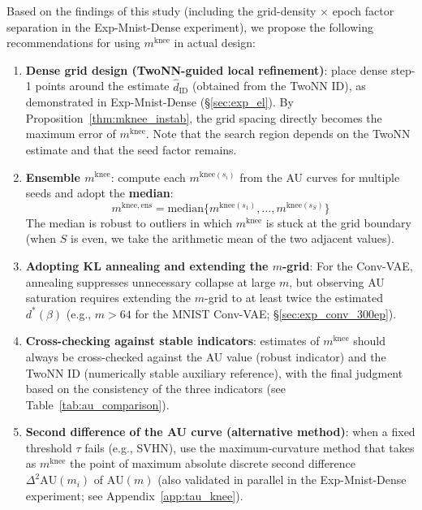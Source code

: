 \documentclass[make,article,submit,pdftex,moreauthors]{Definitions/mdpi}
\newcommand{\mknee}{m^{\mathrm{knee}}}
\begin{document}
Based on the findings of this study (including the grid-density $\times$ epoch factor
separation in the Exp-Mnist-Dense experiment), we propose the following recommendations
for using $\mknee$ in actual design:
\begin{enumerate}
  \item \textbf{Dense grid design (TwoNN-guided local refinement)}: place dense
        step-1 points around the estimate $\hat{d}_\mathrm{ID}$ (obtained from the TwoNN
        ID), as demonstrated in Exp-Mnist-Dense (\S\ref{sec:exp_el}).
        By Proposition~\ref{thm:mknee_instab}, the grid spacing directly becomes the
        maximum error of $\mknee$.
        Note that the search region depends on the TwoNN estimate and that the seed
        factor remains.
  \item \textbf{Ensemble $\mknee$}: compute each $m^{\mathrm{knee}(s_i)}$ from the AU
        curves for multiple seeds and adopt the \textbf{median}:
        \begin{equation}
          m^{\mathrm{knee,ens}} = \mathrm{median}\bigl\{m^{\mathrm{knee}(s_1)}, \ldots, m^{\mathrm{knee}(s_S)}\bigr\}
          \label{eq:mknee_ens}
        \end{equation}
        The median is robust to outliers in which $\mknee$ is stuck at the grid
        boundary (when $S$ is even, we take the arithmetic mean of the two adjacent
        values).
  \item \textbf{Adopting KL annealing and extending the $m$-grid}: For the Conv-VAE,
        annealing suppresses unnecessary collapse at large $m$, but observing AU
        saturation requires extending the $m$-grid to at least twice the estimated
        $d^*(\beta)$ (e.g., $m > 64$ for the MNIST Conv-VAE; \S\ref{sec:exp_conv_300ep}).
  \item \textbf{Cross-checking against stable indicators}: estimates of $\mknee$ should
        always be cross-checked against the AU value (robust indicator) and the TwoNN ID
        (numerically stable auxiliary reference), with the final judgment based on the
        consistency of the three indicators (see Table~\ref{tab:au_comparison}).
  \item \textbf{Second difference of the AU curve (alternative method)}: when a fixed
        threshold $\tau$ fails (e.g., SVHN), use the maximum-curvature method that takes
        as $\mknee$ the point of maximum absolute discrete second difference
        $\Delta^2\mathrm{AU}(m_i)$ of $\mathrm{AU}(m)$ (also validated in parallel in the
        Exp-Mnist-Dense experiment; see Appendix~\ref{app:tau_knee}).
\end{enumerate}
\end{document}

